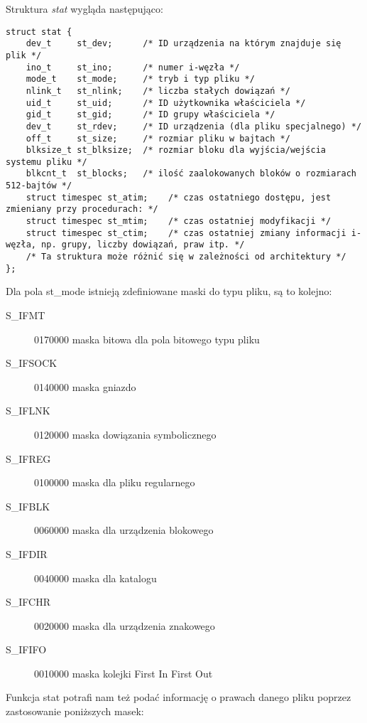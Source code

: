 \documentclass{article}
\begin{document}
Struktura \textit{stat} wygląda następująco:
\begin{verbatim}
struct stat {
    dev_t     st_dev;      /* ID urządzenia na którym znajduje się plik */
    ino_t     st_ino;      /* numer i-węzła */
    mode_t    st_mode;     /* tryb i typ pliku */
    nlink_t   st_nlink;    /* liczba stałych dowiązań */
    uid_t     st_uid;      /* ID użytkownika właściciela */
    gid_t     st_gid;      /* ID grupy właściciela */
    dev_t     st_rdev;     /* ID urządzenia (dla pliku specjalnego) */
    off_t     st_size;     /* rozmiar pliku w bajtach */
    blksize_t st_blksize;  /* rozmiar bloku dla wyjścia/wejścia systemu pliku */
    blkcnt_t  st_blocks;   /* ilość zaalokowanych bloków o rozmiarach 512-bajtów */
    struct timespec st_atim;    /* czas ostatniego dostępu, jest zmieniany przy procedurach: */
    struct timespec st_mtim;    /* czas ostatniej modyfikacji */
    struct timespec st_ctim;    /* czas ostatniej zmiany informacji i-węzła, np. grupy, liczby dowiązań, praw itp. */
    /* Ta struktura może różnić się w zależności od architektury */
};
\end{verbatim}
Dla pola st\_mode istnieją zdefiniowane maski do typu pliku, są to kolejno:
\begin{description}
\item[S\_IFMT]	0170000	maska bitowa dla pola bitowego typu pliku
\item[S\_IFSOCK]0140000	maska gniazdo
\item[S\_IFLNK]	0120000	maska dowiązania symbolicznego
\item[S\_IFREG]	0100000	maska dla pliku regularnego
\item[S\_IFBLK]	0060000	maska dla urządzenia blokowego
\item[S\_IFDIR]	0040000	maska dla katalogu
\item[S\_IFCHR]	0020000	maska dla urządzenia znakowego
\item[S\_IFIFO]	0010000	maska kolejki First In First Out
\end{description}
Funkcja stat potrafi nam też podać informację o prawach danego pliku poprzez zastosowanie poniższych masek:
\end{document}
